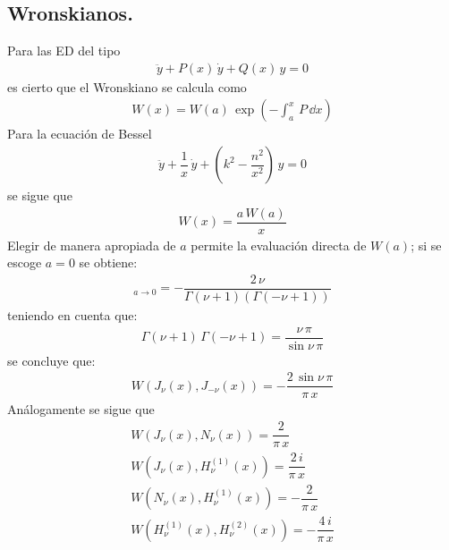 \subsection{Wronskianos.}
Para las ED del tipo
\begin{align*}
\ddot{y} + P(x) \, \dot{y} + Q(x) \, y = 0
\end{align*}
es cierto que el Wronskiano se calcula como
\begin{align*}
W(x) = W(a) \, \exp(- \int_{a}^{x} \, P \, \dd x)
\end{align*}
Para la ecuación de Bessel
\begin{align*}
\ddot{y} + \dfrac{1}{x} \, \dot{y} + \left( k^{2} - \dfrac{n^{2}}{x^{2}} \right) \, y = 0
\end{align*}
se sigue que
\begin{align*}
W(x) = \dfrac{a \, W(a)}{x}
\end{align*}
Elegir de manera apropiada de $a$ permite la evaluación directa de $W(a)$; si se escoge $a=0$ se obtiene:
\begin{align*}
[a \, W(a)]_{a \to 0} =  - \dfrac{2 \, \nu}{\Gamma(\nu + 1)(\Gamma (-\nu +1))}
\end{align*}
teniendo en cuenta que:
\begin{align*}
\Gamma (\nu + 1) \, \Gamma (-\nu + 1) = \dfrac{\nu \, \pi}{\sin \nu \,\pi }
\end{align*}
se concluye que:
\begin{align*}
W (J_{\nu} (x), J_{-\nu} (x)) = - \dfrac{2 \, \sin \nu \, \pi}{\pi \, x}
\end{align*}
Análogamente se sigue que
\begin{align*}
W (J_{\nu} (x), N_{\nu} (x)) = \dfrac{2}{\pi \, x} \\[1em]
W (J_{\nu} (x), H_{\nu}^{(1)} (x)) =  \dfrac{2 \, i}{\pi \, x} \\[1em]
W (N_{\nu} (x), H_{\nu}^{(1)} (x)) = - \dfrac{2}{\pi \, x} \\[1em]
W (H_{\nu}^{(1)} (x), H_{\nu}^{(2)} (x)) = - \dfrac{4 \, i}{\pi \, x}
\end{align*}
